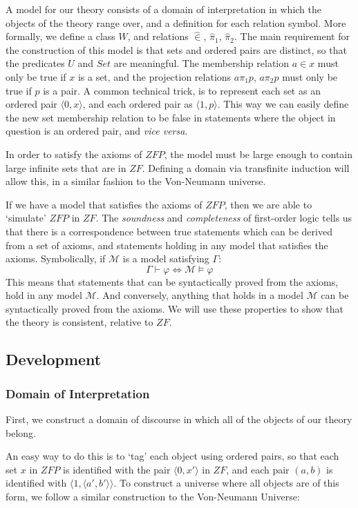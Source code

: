 \documentclass[11pt]{report}
\newcommand{\pleft}{\mathrel{\pi_1}}
\newcommand{\pright}{\mathrel{\pi_2}}
\newcommand{\pair}[2]{\langle #1,#2 \rangle}
\newcommand{\zin}{\mathrel{\widehat{\in}}}
\newcommand{\zpright}{\mathrel{\widehat{\pi}_2}}
\newcommand{\zpleft}{\mathrel{\widehat{\pi}_1}}
\theoremstyle{definition}
\theoremstyle{theorem}
\theoremstyle{lemma}
\begin{document}
A model for our theory consists of a domain of interpretation in which the objects of the theory range over, and a definition for each relation symbol.
More formally, we define a class $W$, and relations $\zin$, $\zpleft$, $\zpright$. 
The main requirement for the construction of this model is that sets and ordered pairs are distinct, so that the predicates $U$ and $\mathit{Set}$ are meaningful.
The membership relation $a\in x$ must only be true if $x$ is a set, and the projection relations $a\pleft p$, $a\pright p$ must only be true if $p$ is a pair.
A common technical trick, is to represent each set as an ordered pair $\pair{0}{x}$, and each ordered pair as $\pair{1}{p}$.
This way we can easily define the new set membership relation to be false in statements where the object in question is an ordered pair, and \emph{vice versa}. 

In order to satisfy the axioms of $\mathit{ZFP}$, the model must be large enough to contain large infinite sets that are in $\mathit{ZF}$. 
Defining a domain via transfinite induction will allow this, in a similar fashion to the Von-Neumann universe.  

If we have a model that satisfies the axioms of $\mathit{ZFP}$, then we are able to `simulate' $\mathit{ZFP}$ in $\mathit{ZF}$.
The \emph{soundness} and \emph{completeness} of first-order logic tells us that there is a correspondence between true statements which can be derived from a set of axioms, and statements holding in any model that satisfies the axioms. 
Symbolically, if $\mathcal{M}$ is a model satisfying $\Gamma$: 
$$\Gamma \vdash \varphi \iff \mathcal{M}\vDash \varphi $$
This means that statements that can be syntactically proved from the axioms, hold in any model $\mathcal{M}$. 
And conversely, anything that holds in a model $\mathcal{M}$ can be syntactically proved from the axioms. 
We will use these properties to show that the theory is consistent, relative to $\mathit{ZF}$.

\subsection{Development}\label{zfpmodel}

\subsubsection{Domain of Interpretation}
First, we construct a domain of discourse in which all of the objects of our theory belong.

An easy way to do this is to `tag' each object using ordered pairs, so that each set $x$ in $\mathit{ZFP}$ is identified with the pair $\pair{0}{x'}$ in $\mathit{ZF}$, and each pair $(a,b)$ is identified with $\pair{1}{\pair{a'}{b'}}$. To construct a universe where all objects are of this form, we follow a similar construction to the Von-Neumann Universe:
\end{document}
